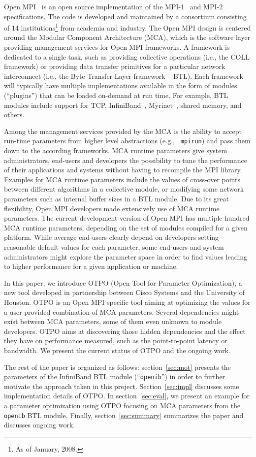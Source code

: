 Open MPI~\cite{gabriel:ompi} is an open source implementation of the
MPI-1~\cite{mpi1} and MPI-2~\cite{mpi2} specifications. The code is
developed and maintained by a consortium consisting of 14
institutions\footnote{As
of January, 2008.} from academia and
industry. The Open MPI design is centered around the Modular Component
Architecture (MCA), which is the software layer providing management
services for Open MPI frameworks. A framework is dedicated to a
single task, such as providing collective operations (i.e., the COLL
framework) or providing data transfer primitives for a particular
network interconnect (i.e., the Byte Transfer Layer framework --
BTL). Each framework will typically have multiple implementations
available in the form of modules (``plugins'') that can be loaded on-demand at run
time.  For example, BTL modules include support for TCP, InfiniBand~\cite{ib},
Myrinet~\cite{myrinet}, shared memory, and others.

Among the management services provided by the MCA is the ability to
accept run-time parameters from higher level abstractions (e.g., {\tt
mpirun}) and pass them down to the according frameworks. MCA runtime
parameters give system administrators, end-users and developers the
possibility to tune the performance of their applications and systems
without having to recompile the MPI library. Examples for MCA runtime
parameters include the values of cross-over points between different 
algorithms in a collective module, or modifying some
network parameters such as internal buffer sizes in a BTL module. Due to its
great flexibility, Open MPI developers made extensively use of MCA runtime parameters.
The current development version of Open MPI has multiple
hundred MCA runtime parameters, depending on the set of modules
compiled for a given platform. While average end-users clearly depend
on developers setting reasonable default values for each parameter,
some end-users and system administrators might explore the
parameter space in order to find values leading to
higher performance for a given application or machine.

In this paper, we introduce OTPO (Open Tool for Parameter
Optimization), a new tool developed in partnership between Cisco
Systems and the University of Houston. OTPO is an Open MPI specific
tool aiming at optimizing the values for a user provided combination
of MCA parameters. Several dependencies might exist between MCA
parameters, some of them even unknown to module developers. OTPO aims
at discovering those hidden dependencies and the effect they have on
performance measured, such as the point-to-point latency or
bandwidth. We present the current status of OTPO and the ongoing work.

The rest of the paper is organized as follows: section~\ref{sec:mot}
presents the parameters of the InfiniBand BTL module (``{\tt openib}'') in order to further motivate the approach taken 
in this project. Section~\ref{sec:impl} discusses some implementation
details of OTPO. In section~\ref{sec:eval}, we present an example for a
parameter optimization using OTPO focusing on MCA parameters from the
{\tt openib} BTL module. Finally, section~\ref{sec:summary} summarizes
the paper and discusses ongoing work.

